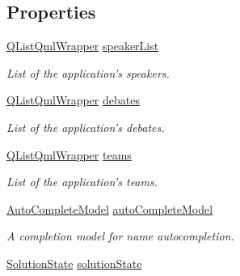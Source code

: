 \subsection*{Properties}
\begin{DoxyCompactItemize}
\item 
\hypertarget{classMainModel_af743b97d42a665f38d8749bc7e1ee5ae}{\hyperlink{classQListQmlWrapper}{Q\-List\-Qml\-Wrapper} \hyperlink{classMainModel_af743b97d42a665f38d8749bc7e1ee5ae}{speaker\-List}}\label{classMainModel_af743b97d42a665f38d8749bc7e1ee5ae}

\begin{DoxyCompactList}\small\item\em List of the application's speakers. \end{DoxyCompactList}\item 
\hypertarget{classMainModel_ab61e1b1925f4dc1ae94cdcafc579e3fe}{\hyperlink{classQListQmlWrapper}{Q\-List\-Qml\-Wrapper} \hyperlink{classMainModel_ab61e1b1925f4dc1ae94cdcafc579e3fe}{debates}}\label{classMainModel_ab61e1b1925f4dc1ae94cdcafc579e3fe}

\begin{DoxyCompactList}\small\item\em List of the application's debates. \end{DoxyCompactList}\item 
\hypertarget{classMainModel_a7a0f8bad4ddc9a082d3ce3cc3e5612d9}{\hyperlink{classQListQmlWrapper}{Q\-List\-Qml\-Wrapper} \hyperlink{classMainModel_a7a0f8bad4ddc9a082d3ce3cc3e5612d9}{teams}}\label{classMainModel_a7a0f8bad4ddc9a082d3ce3cc3e5612d9}

\begin{DoxyCompactList}\small\item\em List of the application's teams. \end{DoxyCompactList}\item 
\hypertarget{classMainModel_ab356492b5fc27678a76529d6fa572fac}{\hyperlink{classAutoCompleteModel}{Auto\-Complete\-Model} \hyperlink{classMainModel_ab356492b5fc27678a76529d6fa572fac}{auto\-Complete\-Model}}\label{classMainModel_ab356492b5fc27678a76529d6fa572fac}

\begin{DoxyCompactList}\small\item\em A completion model for name autocompletion. \end{DoxyCompactList}\item 
\hypertarget{classMainModel_a247bfaf9d5b5083ab21a81be2f80c2f2}{\hyperlink{classMainModel_ab0047ea86efa2a40e9aff734f897c330}{Solution\-State} \hyperlink{classMainModel_a247bfaf9d5b5083ab21a81be2f80c2f2}{solution\-State}}\label{classMainModel_a247bfaf9d5b5083ab21a81be2f80c2f2}


\end{DoxyCompactItemize}
